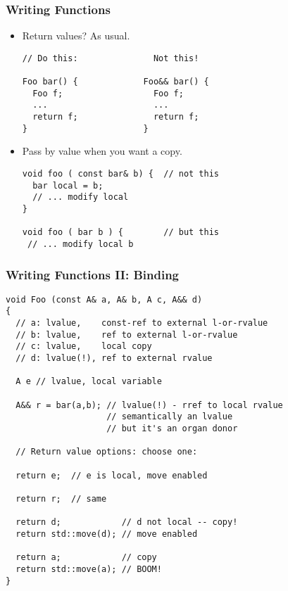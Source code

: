 
\begin{frame}[fragile]
\frametitle{Writing Functions}
\begin{itemize}
\item Return values?  As usual.
{\scriptsize
\begin{verbatim}
// Do this:               Not this!

Foo bar() {             Foo&& bar() {
  Foo f;                  Foo f;
  ...                     ...
  return f;               return f;
}                       }

\end{verbatim}
}
\item Pass by value when you want a copy.
{\scriptsize
\begin{verbatim}
void foo ( const bar& b) {  // not this
  bar local = b;
  // ... modify local
}

void foo ( bar b ) {        // but this
 // ... modify local b
\end{verbatim}
}
\end{itemize}

\end{frame}



\begin{frame}[fragile]
\frametitle{Writing Functions II: Binding}
{\scriptsize
\begin{verbatim}
void Foo (const A& a, A& b, A c, A&& d)
{
  // a: lvalue,    const-ref to external l-or-rvalue
  // b: lvalue,    ref to external l-or-rvalue
  // c: lvalue,    local copy
  // d: lvalue(!), ref to external rvalue

  A e // lvalue, local variable

  A&& r = bar(a,b); // lvalue(!) - rref to local rvalue
                    // semantically an lvalue
                    // but it's an organ donor

  // Return value options: choose one:

  return e;  // e is local, move enabled

  return r;  // same
  
  return d;            // d not local -- copy!
  return std::move(d); // move enabled

  return a;            // copy
  return std::move(a); // BOOM!
}
\end{verbatim}
}

\end{frame}



